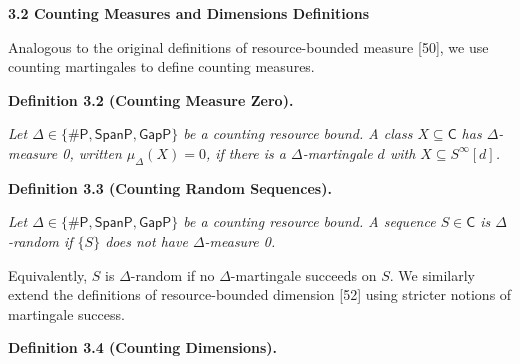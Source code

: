 \documentclass[10pt,a4paper]{article}
\begin{document}




\par\medskip\noindent\textbf{
3.2 Counting Measures and Dimensions Definitions}\par




Analogous to the original definitions of resource-bounded measure [50], we use counting martingales to define counting measures.\par





\par\medskip\noindent\textbf{
\textbf{Definition 3.2}\textbf{ }(Counting Measure Zero)\textbf{.}
}\par



\emph{Let $\Delta\in\{{\mathsf{\#}\mathsf{P}},\mathsf{SpanP},\mathsf{GapP}\}$ be a counting resource bound.
A class $X\subseteq\mathsf{C}$ has $\Delta$-measure 0, written $\mu_{\Delta}(X)=0$, if there is a $\Delta$-martingale $d$ with $X\subseteq S^{\infty}[d]$.}\par







\par\medskip\noindent\textbf{
\textbf{Definition 3.3}\textbf{ }(Counting Random Sequences)\textbf{.}
}\par



\emph{Let $\Delta\in\{{\mathsf{\#}\mathsf{P}},\mathsf{SpanP},\mathsf{GapP}\}$ be a counting resource bound.
A sequence $S\in\mathsf{C}$ is $\Delta$-random if $\{S\}$ does not have $\Delta$-measure 0.}\par






Equivalently, $S$ is $\Delta$-random if no $\Delta$-martingale succeeds on $S$.
We similarly extend the definitions of resource-bounded dimension [52] using stricter notions of martingale success.\par





\par\medskip\noindent\textbf{
\textbf{Definition 3.4}\textbf{ }(Counting Dimensions)\textbf{.}
}\par
\end{document}
